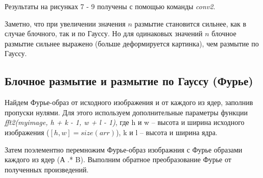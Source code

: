 \documentclass[a5paper, 10pt]{article}
\theoremstyle{definition}
\theoremstyle{plain}
\theoremstyle{remark}
\begin{document}
\newpage
Результаты на рисунках 7 - 9 получены с помощью команды \textit{conv2}. 

Заметно, что при увеличении значения $n$ размытие становится сильнее, как в случае блочного, так и по Гауссу. Но для одинаковых значений $n$ блочное размытие сильнее выражено (больше деформируется картинка), чем размытие по Гауссу.


\subsection{Блочное размытие и размытие по Гауссу (Фурье)}

Найдем Фурье-образ от исходного изображения и от каждого из ядер, заполнив пропуски нулями. Для этого используем дополнительные параметры функции \textit{fft2(myimage, h + k - 1, w + l - 1)}, где h и w -- высота и ширина исходного изображения ($[h, w] = size(arr)$), k и l -- высота и ширина ядра.

Затем поэлементно перемножим Фурье-образ изображния с Фурье образами каждого из ядер (А .* B). Выполним обратное преобразование Фурье от полученных произведений.
\end{document}
